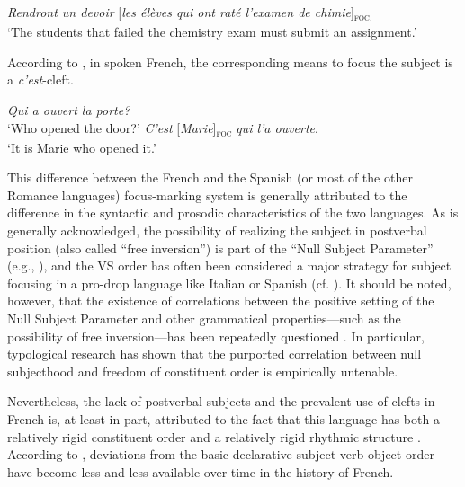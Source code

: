  \ea \label{ex:2:2}
  \textit{Rendront un devoir} {[\textit{les élèves qui ont raté l’examen de chimie}]\textsubscript{\textsc{foc.}}}\normalsize\\
 `The students that failed the chemistry exam must submit an assignment.' \\
 \hfill \parencite[431]{dufter201614}    
\z

According to \textcite{lambrecht1996information}, in spoken French, the corresponding means to focus the subject is a \textit{c'est}-cleft. 

 \ea \label{ex:2:3}
\ea \textit{Qui a ouvert la porte?}\\
 ‘Who opened the door?'
\ex \textit{C'est}  {[\textit{Marie}]\textsubscript{\textsc{foc}}} \normalsize \textit{qui l'a ouverte}.\\
`It is Marie who opened it.'
\z \z 

This difference between the French and the Spanish (or most of the other Romance languages) focus-marking system is generally attributed to the difference in the syntactic and prosodic characteristics of the two languages. As is generally acknowledged, the possibility of realizing the subject in postverbal position (also called ``free inversion”) is part of the ``Null Subject Parameter” (e.g., \cite{rizzi1982issues, biberauer2009parametric}), and the VS order has often been considered a major strategy for subject focusing in a pro-drop language  like  Italian or Spanish (cf. \cite{belletti2008answering}). It should be noted, however, that the existence of correlations between the positive setting of the Null Subject Parameter and other grammatical properties—such as the possibility of free inversion—has been repeatedly questioned \parencite{Newmeyer2005}. In particular, typological research \parencite{Gilligan1987} has shown that the purported correlation between null subjecthood and freedom of constituent order is empirically untenable.

Nevertheless, the lack of postverbal subjects and the prevalent use of clefts in French is, at least in part, attributed to the fact that this language has both a relatively rigid constituent order and a relatively rigid rhythmic structure \parencite{dufter2003rhythmic}.
According to \textcite{dufter201614}, deviations from the basic declarative subject-verb-object order have become less and less available over time in the history of French.


